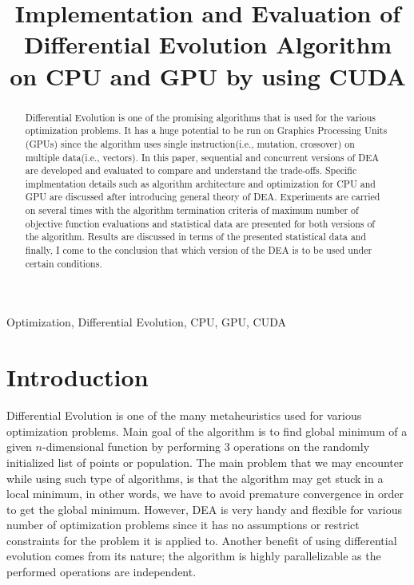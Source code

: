 \documentclass[conference]{IEEEtran}
\begin{document}
\title{Implementation and Evaluation of Differential Evolution Algorithm on CPU and GPU by using CUDA\\
}

\author{
}

\maketitle

\begin{abstract}
	Differential Evolution is one of the promising algorithms that is used for the various optimization problems. It has a huge potential to be run on Graphics Processing Units (GPUs)
	since the algorithm uses single instruction(i.e., mutation, crossover) on multiple data(i.e., vectors). In this paper, sequential and concurrent versions of DEA are developed and evaluated
	to compare and understand the trade-offs. Specific implmentation details such as algorithm architecture and optimization for CPU and GPU are discussed after introducing general theory of DEA.
	Experiments are carried on several times with the algorithm termination criteria of maximum number of objective function evaluations and statistical data are presented for both versions of the algorithm.
	Results are discussed in terms of the presented statistical data and finally, I come to the conclusion that which version of the DEA is to be used under certain conditions.
\end{abstract}

\begin{IEEEkeywords}
	Optimization, Differential Evolution, CPU, GPU, CUDA
\end{IEEEkeywords}

\section{Introduction}
Differential Evolution is one of the many metaheuristics used for various optimization problems. Main goal of the algorithm is to find global minimum of a given $n$-dimensional function by performing 
3 operations on the randomly initialized list of points or population. The main problem that we may encounter while using such type of algorithms, is that the algorithm may get stuck in a local minimum,
in other words, we have to avoid premature convergence in order to get the global minimum. However, DEA is very handy and flexible for various number of optimization problems since it has no assumptions 
or restrict constraints for the problem it is applied to. Another benefit of using differential evolution comes from its nature; the algorithm is highly parallelizable as the performed operations are 
independent.
\end{document}
